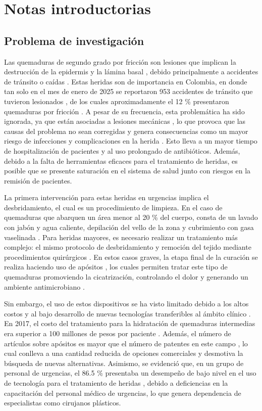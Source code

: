 \documentclass[../../DocumentoCompleto.tex]{subfiles}
\begin{document}
\chapter{Notas introductorias}
\section{Problema de investigación}

Las quemaduras de segundo grado por fricción son lesiones que implican la destrucción de la epidermis y la lámina basal \cite{Fotso2021}, debido principalmente a accidentes de tránsito o caídas \cite{Tracy2023}. Estas heridas son de importancia en Colombia, en donde tan solo en el mes de enero de 2025 se reportaron 953 accidentes de tránsito que tuvieron lesionados \cite{Agencia2025}, de los cuales aproximadamente el 12 \% presentaron quemaduras por fricción \cite{Trujillo2018}. A pesar de su frecuencia, esta problemática ha sido ignorada, ya que están asociadas a lesiones mecánicas \cite{Agrawal2008}, lo que provoca que las causas del problema no sean corregidas y genera consecuencias como un mayor riesgo de infecciones y complicaciones en la herida \cite{Miranda2020}. Esto lleva a un mayor tiempo de hospitalización de pacientes y al uso prolongado de antibióticos. Además, debido a la falta de herramientas eficaces para el tratamiento de heridas, es posible que se presente saturación en el sistema de salud junto con riesgos en la remisión de pacientes. 

La primera intervención para estas heridas en urgencias implica el desbridamiento, el cual es un procedimiento de limpieza. En el caso de quemaduras que abarquen un área menor al 20 \% del cuerpo, consta de un lavado con jabón y agua caliente, depilación del vello de la zona y cubrimiento con gasa vaselinada \cite{Zhang2022}. Para heridas mayores, es necesario realizar un tratamiento más complejo: el mismo protocolo de desbridamiento y remoción del tejido mediante procedimientos quirúrgicos \cite{Kim2024}. En estos casos graves, la etapa final de la curación se realiza haciendo uso de apósitos \cite{Miranda2020}, los cuales permiten tratar este tipo de quemaduras promoviendo la cicatrización, controlando el dolor y generando un ambiente antimicrobiano \cite{Miranda2020}.

Sin embargo, el uso de estos dispositivos se ha visto limitado debido a los altos costos y al bajo desarrollo de nuevas tecnologías transferibles al ámbito clínico \cite{Martinez2020}. En 2017, el costo del tratamiento para la hidratación de quemaduras intermedias era superior a 100 millones de pesos por paciente \cite{Archila2017}. Además, el número de artículos sobre apósitos es mayor que el número de patentes en este campo \cite{Martinez2020}, lo cual conlleva a una cantidad reducida de opciones comerciales y desmotiva la búsqueda de nuevas alternativas. Asimismo, se evidenció que, en un grupo de personal de urgencias, el 86.5 \% presentaba un desempeño de bajo nivel en el uso de tecnología para el tratamiento de heridas \cite{Galvis2018}, debido a deficiencias en la capacitación del personal médico de urgencias, lo que genera dependencia de especialistas como cirujanos plásticos.
\end{document}
